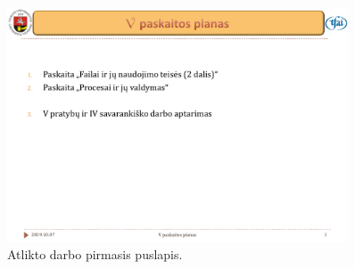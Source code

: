 \documentclass[portrait]{article}
\begin{document}

\maketitle

\begin{abstract}
Atliktas darbas pateiktas pav.~\ref{fig-report}.
\end{abstract}

\begin{figure}[b]
\includegraphics[height=0.8\textheight,width=0.9\textwidth]{pavyzdys.pdf}
\caption{Atlikto darbo pirmasis puslapis.}
\label{fig-report}
\end{figure}
\end{document}
